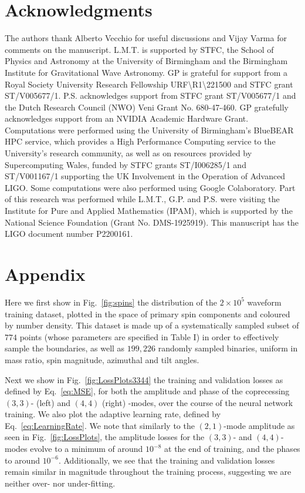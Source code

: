 \documentclass[prd,amssymb,amsmath,amsfonts,superscriptaddress,nofootinbib,reprint,showpacs, longbibliography]{revtex4-1}
\begin{document}
\section*{Acknowledgments}
The authors thank Alberto Vecchio for useful discussions and Vijay Varma for comments on the manuscript.
L.M.T. is supported by STFC, the School of Physics and Astronomy at the University of Birmingham and the Birmingham Institute for Gravitational Wave Astronomy. GP is grateful for support from a Royal Society University Research Fellowship URF{\textbackslash}R1{\textbackslash}221500 and STFC grant ST/V005677/1. P.S. acknowledges support from STFC grant ST/V005677/1 and the Dutch Research Council (NWO) Veni Grant No. 680-47-460. GP gratefully acknowledges support from an NVIDIA Academic Hardware Grant. Computations were performed using the University of Birmingham's BlueBEAR HPC service, which provides a High Performance Computing service to the University's research community, as well as on resources provided by Supercomputing Wales, funded by STFC grants ST/I006285/1 and ST/V001167/1 supporting the UK Involvement in the Operation of Advanced LIGO. Some computations were also performed using Google Colaboratory. Part of this research was performed while L.M.T., G.P. and P.S. were visiting the Institute for Pure and Applied Mathematics (IPAM), which is supported by the National Science Foundation (Grant No. DMS-1925919).
This manuscript has the LIGO document number P2200161.


\appendix
\section*{Appendix}
\label{sec:app}
Here we first show in Fig.~\ref{fig:spins} the distribution of the $2\times 10^5$ waveform training dataset, plotted in the space of primary spin components and coloured by number density. This dataset is made up of a systematically sampled subset of $774$ points (whose parameters are specified in Table I) in order to effectively sample the boundaries, as well as $199,226$ randomly sampled binaries, uniform in mass ratio, spin magnitude, azimuthal and tilt angles.

Next we show in Fig.~\ref{fig:LossPlots3344} the training and validation losses as defined by Eq.~\eqref{eq:MSE}, for both the amplitude and phase of the coprecessing $(3,3)$- (left) and $(4,4)$ (right) -modes, over the course of the neural network training. We also plot the adaptive learning rate, defined by Eq.~\eqref{eq:LearningRate}. We note that similarly to the $(2,1)$-mode amplitude as seen in Fig.~\ref{fig:LossPlots}, the amplitude losses for the $(3,3)$- and $(4,4)$-modes evolve to a minimum of around $10^{-8}$ at the end of training, and the phases to around $10^{-6}$. Additionally, we see that the training and validation losses remain similar in magnitude throughout the training process, suggesting we are neither over- nor under-fitting.
\end{document}
